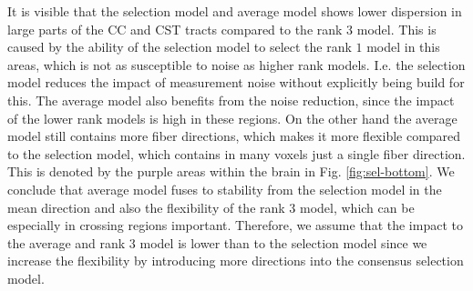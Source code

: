 It is visible that the
selection model and average model shows lower dispersion in large parts of the CC and CST tracts
compared to the rank $3$ model. This is caused by the
ability of the selection model to select the rank $1$ model in this areas, which
is not as susceptible to noise as higher rank models. I.e. the selection model
reduces the impact of measurement noise without explicitly being build for
this. The average model also benefits from the noise reduction, since the impact
of the lower rank models is high in these regions.
On the other hand the average model still contains more fiber directions, which
makes it more flexible compared to the selection model, which contains in many
voxels just a single fiber direction. This is denoted by the purple areas within
the brain in Fig. \ref{fig:sel-bottom}.
We conclude that average model fuses to stability from the selection model in
the mean direction and also the flexibility of the rank $3$ model, which can be
especially in crossing regions important.
Therefore, we assume that the impact to the average and rank $3$ model is lower
than to the selection model since we increase the flexibility by introducing
more directions into the consensus selection model. 


